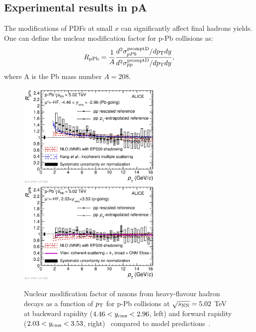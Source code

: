 \subsection{Experimental results in pA}
The modifications of PDFs at small $x$ can significantly affect final hadrons yields.
One can define the nuclear modification factor for p-Pb collisions as:
\begin{equation}
R_{\rm pPb} = \frac{1}{A}\frac{d^2\sigma_{pPb}^{\rm prompt D}/dp_{\rm T} dy}{d^2\sigma_{pp}^{\rm prompt D}/dp_{\rm T} dy},
\end{equation}
where A is the Pb mass number $A = 208$. \\
\begin{figure}[!ht]
  \centering
  \includegraphics[width=7cm]{FigCap2/2017-Feb-05-Fig2b.pdf}
  \includegraphics[width=7cm]{FigCap2/2017-Feb-05-Fig2a.pdf}
  \caption{Nuclear modification factor of muons from heavy-flavour hadron decays as a function of $p_{\rm T}$ for p-Pb collisions at $\sqrt{s_{\rm NN}} = 5.02$ TeV at backward rapidity ($4.46 < y_{\rm cms} < 2.96$, left) and forward rapidity ($2.03 < y_{\rm cms} < 3.53$, right)~\cite{Acharya:2017hdv} compared to model predictions~\cite{Kang:2014hha,Mangano:1991jk}. }
  \label{fig:muons}
\end{figure}

